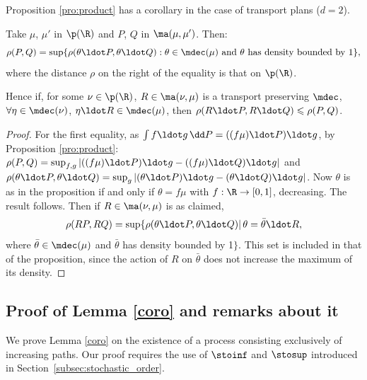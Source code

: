 Proposition \ref{pro:product} has a corollary in the case of transport plans ($d=2$).
\begin{pro}\label{pro:multiplicationcontractante}Take $\mu$, $\mu'$ in $\p(\R)$ and $P$, $Q$ in $\ma(\mu,\mu')$. Then:
\[\rho(P,Q)=\sup\{\rho(\theta\ldot P, \theta \ldot Q):\theta\in\mdec(\mu)\ \text{and $\theta$ has density bounded by $1$}\},\]
where the distance $\rho$ on the right of the equality is that on $\p(\R)$.

Hence if, for some $\nu\in \p(\R)$, $R\in\ma(\nu,\mu)$ is a transport preserving $\mdec$, \ie $\forall\eta\in\mdec(\nu)$, $\eta\ldot R\in\mdec(\mu)$, then $\rho(R\ldot P,R\ldot Q)\leqslant\rho(P,Q)$.
\end{pro}

\begin{proof}
For the first equality, as $\int f\ldot g\, \dd P=((f\mu)\ldot P)\ldot g$, by Proposition \ref{pro:product}: $\rho(P,Q)=\sup_{f,g} |((f\mu)\ldot P)\ldot g-((f\mu)\ldot Q)\ldot g|$ and $\rho(\theta\ldot P, \theta \ldot Q)=\sup_g |(\theta\ldot P)\ldot g-(\theta\ldot Q)\ldot g|$. Now $\theta$ is as in the proposition if and only if $\theta=f\mu$ with $f:\R\to[0,1]$, decreasing. The result follows. Then if $R\in\ma(\nu,\mu)$ is as claimed,
\[
\rho(RP,RQ)=\sup\{\rho(\theta\ldot P, \theta \ldot Q)|\,\theta=\bar\theta\ldot R,
\]
where $\bar\theta\in\mdec(\mu)$ and $\bar\theta$ has density bounded by 1$\}$. This set is included in that of the proposition, since the action of $R$ on $\bar\theta$ does not increase the maximum of its density.
\end{proof}

\subsection{Proof of Lemma \ref{coro} and remarks about it}\label{subsec:proof_coro}

We prove Lemma \ref{coro} on the existence of a process consisting exclusively of increasing paths. Our proof requires the use of $\stoinf$ and $\stosup$ introduced in Section~\ref{subsec:stochastic_order}.

